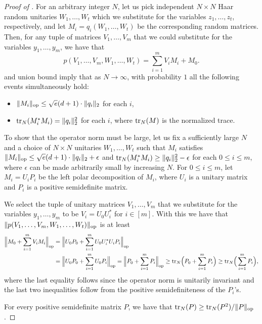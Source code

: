 \begin{proof}[Proof of ]
     For an arbitrary integer $N$, let us pick independent $N \times N$ Haar random unitaries $W_1, \ldots, W_t$ which we substitute for the variables $z_1,\ldots,z_t$, respectively, and let $M_i = q_i(W_1, \ldots, W_t)$ be the corresponding random matrices. Then, for any tuple of matrices $V_1, \ldots, V_m$ that we could substitute for the variables $y_1, \ldots, y_m$, we have that 
    \[ 
    p(V_1, \ldots, V_m, W_1, \ldots, W_t) = \sum_{i=1}^m V_i M_i + M_0.
    \] 
      and union bound imply that as $N \to \infty$, with probability $1$ all the following events simultaneously hold: 
    \begin{itemize}
        \item $\|M_i\|_{\mathrm{op}} \le \sqrt{e}(d+1) \cdot \|q_i\|_2$ for each $i$,
        \item $\mathrm{tr}_N(M^*_iM_i) = \|q_i\|_2^2$ for each $i$, where $\mathrm{tr}_N(M)$ is the normalized trace.
    \end{itemize}
   To show that the operator norm must be large, let us fix a sufficiently large $N$ and a choice of $N\times N$ unitaries $W_1, \ldots, W_t$ such that $M_i$ satisfies $\|M_i\|_{\mathrm{op}} \le \sqrt{e}(d+1) \cdot \|q_i\|_2 + \epsilon$ and $\mathrm{tr}_N(M^*_iM_i) \ge \|q_i\|_2^2 - \epsilon$ for each $0\le i\le m$, where $\epsilon$ can be made arbitrarily small by increasing $N$. For $0 \leq i \leq m$, let $M_i = U_i P_i$ be the left polar decomposition of $M_i$, where $U_i$ is a unitary matrix and $P_i$ is a positive semidefinite matrix.
   
   We select the tuple of unitary matrices $V_1, \ldots, V_m$ that we substitute for the variables $y_1, \ldots, y_m$ to be $V_i = U_0U^*_i$ for $i \in [m]$. With this we have that $\|p(V_1, \ldots, V_m, W_1, \ldots, W_t)\|_{\mathrm{op}}$ is at least
    \begin{align*}
         \Big\|M_0 + \sum_{i=1}^m V_iM_i\Big\|_{\mathrm{op}} & = \Big\|U_0 P_0 + \sum_{i=1}^m U_0 U_i^* U_iP_i \Big\|_{\mathrm{op}} \\
        \ & =  \Big\|U_0 P_0 + \sum_{i=1}^m U_0 P_i\Big\|_{\mathrm{op}}  = \Big\| P_0 + \sum_{i=1}^m  P_i\Big\|_{\mathrm{op}}\ge \mathrm{tr}_N\Big(P_0 + \sum_{i=1}^m P_i\Big) \ge \mathrm{tr}_N\Big(\sum_{i=1}^m P_i\Big),
    \end{align*}
    where the last equality follows since the operator norm is unitarily invariant and the last two inequalities follow from the positive semidefiniteness of the $P_i$'s.

    For every positive semidefinite matrix $P$, we have that $\mathrm{tr}_N(P) \ge {\mathrm{tr}_N(P^2)}/{\|P\|_{\mathrm{op}}}$. 
  

\end{proof}
